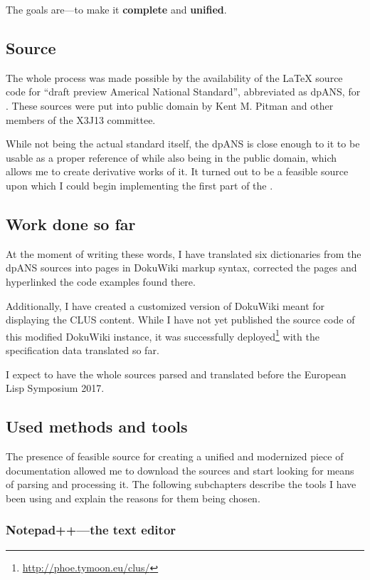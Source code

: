 The goals are---to make it \textbf{complete} and \textbf{unified}.

\subsection{Source}

The whole process was made possible by the availability of the \LaTeX{} source code for ``draft preview Americal National Standard'', abbreviated as dpANS, for \cl{}. These sources were put into public domain by Kent M. Pitman and other members of the X3J13 committee.

While not being the actual standard itself, the dpANS is close enough to it to be usable as a proper reference of \cl{} while also being in the public domain, which allows me to create derivative works of it. It turned out to be a feasible source upon which I could begin implementing the first part of the \us{}.

\subsection{Work done so far}

At the moment of writing these words, I have translated six dictionaries from the dpANS sources into pages in Doku\-Wiki markup syntax, corrected the pages and hyperlinked the code examples found there.

Additionally, I have created a customized version of Doku\-Wiki meant for displaying the CLUS content. While I have not yet published the source code of this modified Doku\-Wiki instance, it was successfully deployed\footnote{\url{http://phoe.tymoon.eu/clus/}} with the specification data translated so far.

I expect to have the whole sources parsed and translated before the European Lisp Symposium 2017.

\subsection{Used methods and tools}

The presence of feasible source for creating a unified and modernized piece of \cl{} documentation allowed me to download the sources and start looking for means of parsing and processing it. The following subchapters describe the tools I have been using and explain the reasons for them being chosen.

\subsubsection{Notepad++---the text editor}

